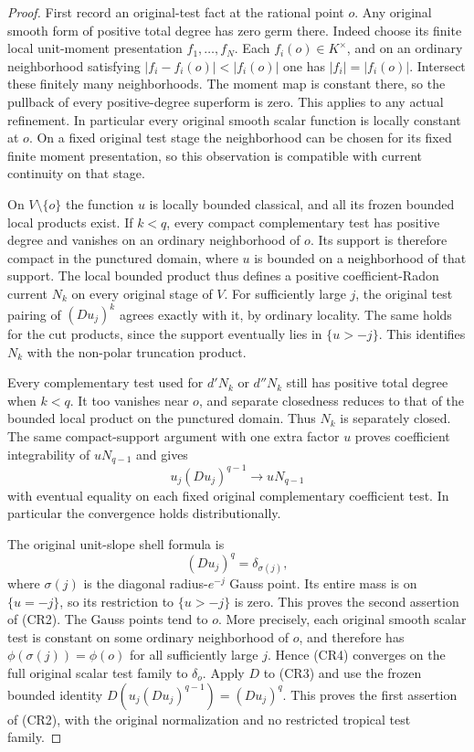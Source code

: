 \documentclass[11pt,a4paper]{article}
\numberwithin{equation}{section}
\theoremstyle{definition}
\theoremstyle{remark}
\begin{document}
\begin{proof}
First record an original-test fact at the rational point $o$.
Any original smooth form of positive total degree has zero germ
there. Indeed choose its finite local unit-moment presentation
$f_1,\ldots,f_N$. Each $f_i(o)\in K^\times$, and on an
ordinary neighborhood satisfying
$|f_i-f_i(o)|<|f_i(o)|$ one has $|f_i|=|f_i(o)|$.
Intersect these finitely many neighborhoods. The moment map
is constant there, so the pullback of every positive-degree
superform is zero. This applies to any actual refinement.
In particular every original smooth scalar function is locally
constant at $o$. On a fixed original test stage the neighborhood
can be chosen for its fixed finite moment presentation, so this
observation is compatible with current continuity on that stage.

On $V\setminus\{o\}$ the function $u$ is locally bounded
classical, and all its frozen bounded local products exist.
If $k<q$, every compact complementary test has positive degree
and vanishes on an ordinary neighborhood of $o$. Its support
is therefore compact in the punctured domain, where $u$ is
bounded on a neighborhood of that support. The local bounded
product thus defines a positive coefficient-Radon current
$N_k$ on every original stage of $V$. For sufficiently large
$j$, the original test pairing of $(Du_j)^k$ agrees exactly
with it, by ordinary locality. The same holds for the cut
products, since the support eventually lies in $\{u>-j\}$.
This identifies $N_k$ with the non-polar truncation product.

Every complementary test used for $d'N_k$ or $d''N_k$ still
has positive total degree when $k<q$. It too vanishes near
$o$, and separate closedness reduces to that of the bounded
local product on the punctured domain. Thus $N_k$ is separately
closed. The same compact-support argument with one extra factor
$u$ proves coefficient integrability of $uN_{q-1}$ and gives
\[
                  u_j(Du_j)^{q-1}\longrightarrow uN_{q-1}
 \tag{CR3}
\]
with eventual equality on each fixed original complementary
coefficient test. In particular the convergence holds
distributionally.

The original unit-slope shell formula is
\[
                        (Du_j)^q=\delta_{\sigma(j)},
 \tag{CR4}
\]
where $\sigma(j)$ is the diagonal radius-$e^{-j}$ Gauss point.
Its entire mass is on $\{u=-j\}$, so its restriction to
$\{u>-j\}$ is zero. This proves the second assertion of
(CR2). The Gauss points tend to $o$. More precisely, each
original smooth scalar test is constant on some ordinary
neighborhood of $o$, and therefore has
$\phi(\sigma(j))=\phi(o)$ for all sufficiently large $j$.
Hence (CR4) converges on the full original scalar test family
to $\delta_o$. Apply $D$ to (CR3) and use the frozen bounded
identity $D(u_j(Du_j)^{q-1})=(Du_j)^q$.
This proves the first assertion of (CR2), with the original
normalization and no restricted tropical test family.
\end{proof}
\end{document}
